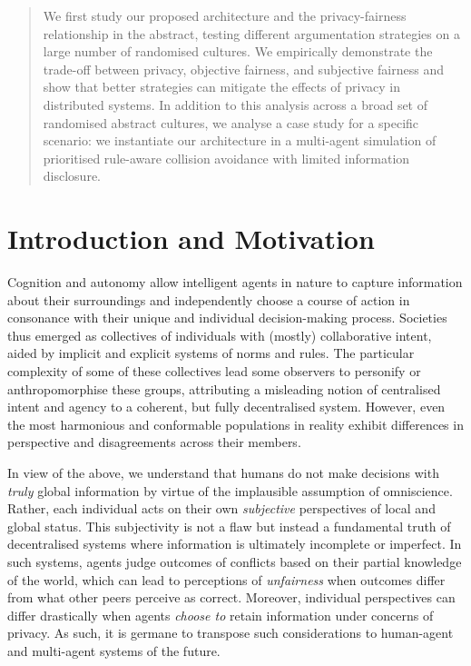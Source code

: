 \documentclass[acmsmall]{custom-arxiv}  %
\begin{document}
\begin{abstract}
We first study our proposed architecture and the privacy-fairness relationship in the abstract, testing different argumentation strategies on a large number of randomised cultures. We empirically demonstrate the trade-off between privacy, objective fairness, and subjective fairness and show that better strategies can mitigate the effects of privacy in distributed systems. In addition to this analysis across a broad set of randomised abstract cultures, we analyse a case study for a specific scenario: we instantiate our architecture in a multi-agent simulation of prioritised rule-aware collision avoidance with limited information disclosure.





\tiny
\end{abstract}

\section{Introduction and Motivation}

Cognition and autonomy allow intelligent agents in nature to capture information about their surroundings and independently choose a course of action in consonance with their unique and individual decision-making process. Societies thus emerged as collectives of individuals with (mostly) collaborative intent, aided by implicit and explicit systems of norms and rules. The particular complexity of some of these collectives lead some observers to personify or anthropomorphise these groups, attributing a misleading notion of centralised intent and agency to a coherent, but fully decentralised system. However, even the most harmonious and conformable populations in reality exhibit differences in perspective and disagreements across their members.

In view of the above, we understand that humans do not make decisions with \textit{truly} global information by virtue of the implausible assumption of omniscience. Rather, each individual acts on their own \textit{subjective} perspectives of local and global status. This subjectivity is not a flaw but instead a fundamental truth of decentralised systems where information is ultimately incomplete or imperfect. In such systems, agents judge outcomes of conflicts based on their partial knowledge of the world, which can lead to perceptions of \textit{unfairness} when outcomes differ from what other peers perceive as correct. Moreover, individual perspectives can differ drastically when agents \textit{choose to} retain information under concerns of privacy. As such, it is germane to transpose such considerations to human-agent and multi-agent systems of the future.
\end{document}
